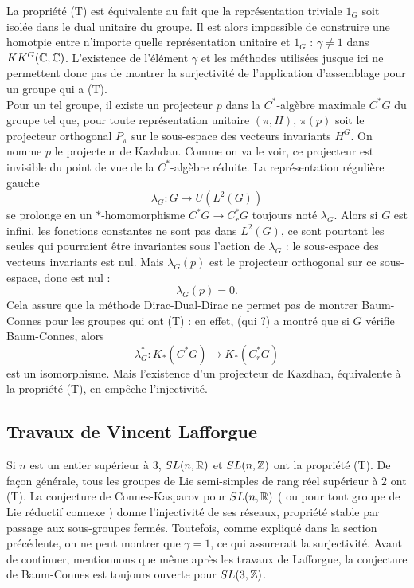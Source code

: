 La propriété (T) est équivalente au fait que la représentation triviale $1_G$ soit isolée dans le dual unitaire du groupe. Il est alors impossible de construire une homotpie entre n'importe quelle représentation unitaire et $1_G$ : $\gamma \neq 1$ dans $KK^G(\mathbb C,\mathbb C)$. L'existence de l'élément $\gamma$ et les méthodes utilisées jusque ici ne permettent donc pas de montrer la surjectivité de l'application d'assemblage pour un groupe qui a (T).\\

Pour un tel groupe, il existe un projecteur $p$ dans la $C^*$-algèbre maximale $C^*G$ du groupe tel que, pour toute représentation unitaire $(\pi,H)$, $\pi(p)$ soit le projecteur orthogonal $P_\pi$ sur le sous-espace des vecteurs invariants $H^G$. On nomme $p$ le projecteur de Kazhdan. Comme on va le voir, ce projecteur est invisible du point de vue de la $C^*$-algèbre réduite. La représentation régulière gauche
\[\lambda_G : G\rightarrow U(L^2(G))\]
se prolonge en un $*$-homomorphisme $C^*G\rightarrow C^*_r G$ toujours noté $\lambda_G$. Alors si $G$ est infini, les fonctions constantes ne sont pas dans $L^2(G)$, ce sont pourtant les seules qui pourraient être invariantes sous l'action de $\lambda_G$ : le sous-espace des vecteurs invariants est nul. Mais $\lambda_G(p)$ est le projecteur orthogonal sur ce sous-espace, donc est nul :
\[\lambda_G(p)=0.\]
Cela assure que la méthode Dirac-Dual-Dirac ne permet pas de montrer Baum-Connes pour les groupes qui ont (T) : en effet, (qui ?) a montré que si $G$ vérifie Baum-Connes, alors 
\[\lambda_G^*: K_*(C^* G)\rightarrow K_*(C^*_r G)\]
est un isomorphisme. Mais l'existence d'un projecteur de Kazdhan, équivalente à la propriété (T), en empêche l'injectivité.\\

\subsection{Travaux de Vincent Lafforgue}

Si $n$ est un entier supérieur à $3$, $SL(n,\mathbb R)$ et $SL(n,\mathbb Z)$ ont la propriété (T). De façon générale, tous les groupes de Lie semi-simples de rang réel supérieur à $2$ ont (T). La conjecture de Connes-Kasparov pour $SL(n,\mathbb R)$ ( ou pour tout groupe de Lie réductif connexe ) donne l'injectivité de ses réseaux, propriété stable par passage aux sous-groupes fermés. Toutefois, comme expliqué dans la section précédente, on ne peut montrer que $\gamma=1$, ce qui assurerait la surjectivité. Avant de continuer, mentionnons que même après les travaux de Lafforgue, la conjecture de Baum-Connes est toujours ouverte pour $SL(3,\mathbb Z)$.\\

